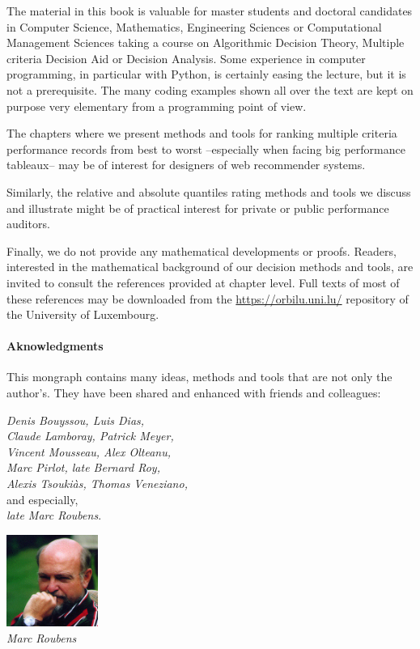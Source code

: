 The material in this book is valuable for master students and doctoral candidates in Computer Science, Mathematics, Engineering Sciences or Computational Management Sciences taking a course on Algorithmic Decision Theory, Multiple criteria Decision Aid or Decision Analysis. Some experience in computer programming, in particular with Python, is certainly easing the lecture, but it is not a prerequisite. The many coding examples shown all over the text are kept on purpose very elementary from a programming point of view. 

The chapters where we present methods and tools for ranking multiple criteria performance records from best to worst --especially when facing big performance tableaux-- may be of interest for designers of web recommender systems. 

Similarly, the relative and absolute quantiles rating methods and tools we discuss and illustrate might be of practical interest for private or public performance auditors.

Finally, we do not provide any mathematical developments or proofs. Readers, interested in the mathematical background of our decision methods and tools, are invited to consult the references provided at chapter level. Full texts of most of these references may be downloaded from the \href{https://orbilu.uni.lu/}{https://orbilu.uni.lu/} repository of the University of Luxembourg. 

\paragraph{Aknowledgments}

This mongraph contains many ideas, methods and tools that are not only the author’s. They have been shared and enhanced with friends and colleagues: 

\vspace{0.5cm}
\begin{minipage}{7cm}
\emph{Denis Bouyssou, Luis Dias,}\\ 
\emph{Claude Lamboray, Patrick Meyer,}\\
\emph{Vincent Mousseau, Alex Olteanu,}\\
\emph{Marc Pirlot, late Bernard Roy,}\\
\emph{Alexis Tsouki\`as, Thomas Veneziano,}\\
and especially,\\
\emph{late Marc Roubens}.
\end{minipage}\quad
\begin{minipage}{3cm}
\includegraphics[width=3cm]{Figures/Marc-Roubens.jpg} \\
{\tiny \emph{Marc Roubens}}
\end{minipage}

